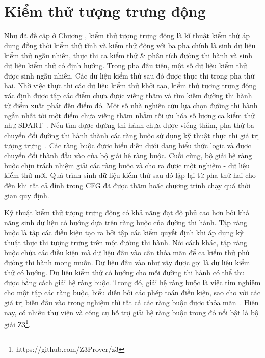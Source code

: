 \section{Kiểm thử tượng trưng động}
Như đã đề cập ở Chương , kiểm thử tượng trưng động là kĩ thuật kiểm thử áp dụng đồng thời kiểm thử tĩnh và kiểm thử động với ba pha chính là sinh dữ liệu kiểm thử ngẫu nhiên, thực thi ca kiểm thử \& phân tích đường thi hành và sinh dữ liệu kiểm thử có định hướng. Trong pha đầu tiên, một số dữ liệu kiểm thử được sinh ngẫu nhiên. Các dữ liệu kiểm thử sau đó được thực thi trong pha thứ hai. Nhờ việc thực thi các dữ liệu kiểm thử khởi tạo, kiểm thử tượng trưng động xác định được tập các điểm chưa được viếng thăm và
tìm kiếm đường thi hành từ điểm xuất phát đến điểm đó. Một số nhà nghiên cứu lựa chọn đường thi hành ngắn nhất tới một điểm chưa viếng thăm nhằm tối ưu hóa số lượng ca kiểm thử như SDART~\cite{SDART}. Nếu tìm được đường thi hành chưa được viếng thăm, pha thứ ba chuyển đổi đường thi hành thành các ràng buộc sử dụng kỹ thuật thực thi giá trị tượng trưng~\cite{SymbolicExecutionForSoftwareTestingThreeDecadesLater}. Các ràng buộc được biểu diễn dưới dạng biểu thức logic và được chuyển đổi thành đầu vào của bộ giải hệ ràng buộc. Cuối cùng, bộ giải hệ ràng buộc chịu trách nhiệm giải các ràng buộc và cho ra được một nghiệm - dữ liệu kiểm thử mới. Quá trình sinh dữ liệu kiểm thử sau đó lặp lại từ pha thứ hai cho đến khi tất cả đỉnh trong CFG đã được thăm hoặc chương trình chạy quá thời gian quy định. 

Kỹ thuật kiểm thử tượng trưng động có khả năng đạt độ phủ cao hơn bởi khả năng sinh dữ liệu có hướng dựa trên ràng buộc của đường thi hành. Tập ràng buộc là tập các điều kiện tạo ra bởi tập các kiểm quyết định khi áp dụng kỹ thuật thực thi tượng trưng trên một đường thi hành. Nói cách khác, tập ràng buộc chứa các điều kiện mà dữ liệu đầu vào cần thỏa mãn để ca kiểm thử phủ đường thi hành mong muốn. Dữ liệu đầu vào như vậy được gọi là dữ liệu kiểm thử có hướng. Dữ liệu kiểm thử có hướng cho mỗi đường thi hành có thể thu được bằng cách giải hệ ràng buộc. Trong đó, giải hệ ràng buộc là việc tìm nghiệm cho một tập các ràng buộc, biểu diễn bởi các phép toán điều kiện, sao cho với các giá trị biến đầu vào trong nghiệm thì tất cả các ràng buộc được thỏa mãn~\cite{ref-constraints}. Hiện nay, có nhiều thư viện và công cụ hỗ trợ giải hệ ràng buộc trong đó nổi bật là bộ giải Z3\footnote{https://github.com/Z3Prover/z3}.


